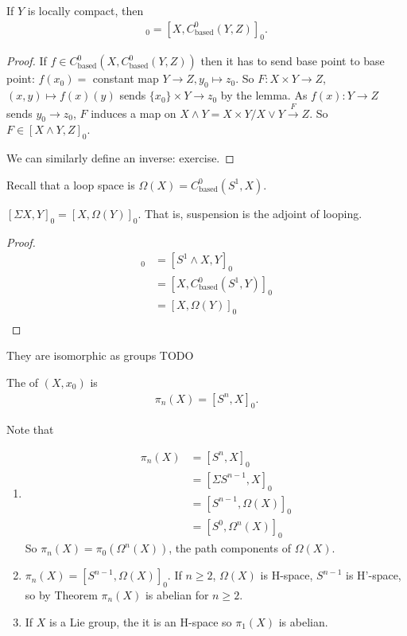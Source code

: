 \documentclass[12pt,class=article,crop=false]{standalone}
\begin{document}
\begin{coro}
If $ Y$ is locally compact, then
 \begin{align*}
	 [X \wedge Y, Z]_0 = [X, C^{0}_{ \text{based} } (Y,Z)]_0.
\end{align*}
\end{coro}
\begin{proof}
	If $ f \in C^{0}_{ \text{based} }(X,C^{0}_{ \text{based} }(Y,Z))$ then it has to send base point to base point: $ f(x_0) =$ constant map $ Y \to Z, y_0 \mapsto z_0$. So $ F: X \times Y \to Z$, $ (x,y) \mapsto f(x)(y)$ sends $ \{x_0\} \times Y \to z_0 $ by the lemma. As $ f(x): Y \to Z$ sends $ y_0 \to z_0$, $ F$ induces a map on  $ X \wedge Y = X \times Y / X \vee Y \xrightarrow{ F} Z$. So $ F \in [X \wedge Y, Z]_0$.

	We can similarly define an inverse: exercise.
\end{proof}

Recall that a loop space is $ \Omega(X) = C^{0}_{ \text{based} }(S^{1},X)$.

\begin{coro}
	$ [\Sigma X, Y]_0 = [X, \Omega(Y)]_0$. That is, suspension is the adjoint of looping.
\end{coro}
\begin{proof}
\begin{align*}
	[\Sigma X, Y]_0 &= [S^{1} \wedge X, Y]_0 \\
		      &= [X, C^{0}_{ \text{based} }(S^{1},Y)]_0 \\
		      &= [X, \Omega(Y)]_0 \\
\end{align*}
\end{proof}
\begin{remark}
They are isomorphic as groups TODO
\end{remark}
\begin{defn}
The  of $ (X,x_0)$ is
\begin{align*}
	\pi_n(X) = [S^{n}, X]_0.
\end{align*}
\end{defn}
Note that
\begin{enumerate}[label=(\arabic*)]
	 \item
		 \begin{align*}
			 \pi_n(X) &= [S^{n}, X]_0 \\
				  &= [\Sigma S^{n-1}, X]_0 \\
				  &= [S^{n-1}, \Omega(X)]_0 \\
				  &= [S^{0}, \Omega^{n}(X)]_0 
		 \end{align*}
		 So $ \pi_n(X) = \pi_0(\Omega^{n}(X))$, the path components of $ \Omega(X)$.
	 \item $ \pi_n(X) = [S^{n-1}, \Omega(X)]_0$. If $ n\geq 2$,  $ \Omega(X)$ is H-space, $ S^{n-1}$ is H'-space, so by Theorem $ \pi_n(X)$ is abelian for $ n \geq 2$.
	 \item If  $ X$ is a Lie group, the it is an H-space so $ \pi_1(X)$ is abelian.
\end{enumerate}
\end{document}
